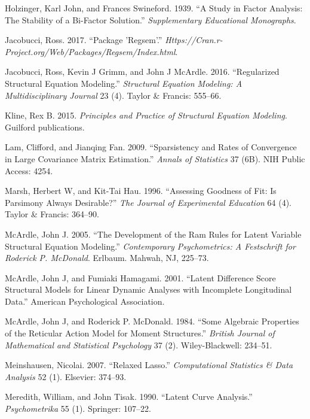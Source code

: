 \documentclass[article]{jss}
\begin{document}
\hypertarget{ref-holzinger1939study}{}
Holzinger, Karl John, and Frances Swineford. 1939. ``A Study in Factor
Analysis: The Stability of a Bi-Factor Solution.'' \emph{Supplementary
Educational Monographs}.

\hypertarget{ref-jacobucci2016package}{}
Jacobucci, Ross. 2017. ``Package 'Regsem'.''
\emph{Https://Cran.r-Project.org/Web/Packages/Regsem/Index.html}.

\hypertarget{ref-jacobucci2016regularized}{}
Jacobucci, Ross, Kevin J Grimm, and John J McArdle. 2016. ``Regularized
Structural Equation Modeling.'' \emph{Structural Equation Modeling: A
Multidisciplinary Journal} 23 (4). Taylor \& Francis: 555--66.

\hypertarget{ref-kline2015principles}{}
Kline, Rex B. 2015. \emph{Principles and Practice of Structural Equation
Modeling}. Guilford publications.

\hypertarget{ref-lam2009sparsistency}{}
Lam, Clifford, and Jianqing Fan. 2009. ``Sparsistency and Rates of
Convergence in Large Covariance Matrix Estimation.'' \emph{Annals of
Statistics} 37 (6B). NIH Public Access: 4254.

\hypertarget{ref-marsh1996assessing}{}
Marsh, Herbert W, and Kit-Tai Hau. 1996. ``Assessing Goodness of Fit: Is
Parsimony Always Desirable?'' \emph{The Journal of Experimental
Education} 64 (4). Taylor \& Francis: 364--90.

\hypertarget{ref-mcardle2005}{}
McArdle, John J. 2005. ``The Development of the Ram Rules for Latent
Variable Structural Equation Modeling.'' \emph{Contemporary
Psychometrics: A Festschrift for Roderick P. McDonald}. Erlbaum. Mahwah,
NJ, 225--73.

\hypertarget{ref-mcardle2001latent}{}
McArdle, John J, and Fumiaki Hamagami. 2001. ``Latent Difference Score
Structural Models for Linear Dynamic Analyses with Incomplete
Longitudinal Data.'' American Psychological Association.

\hypertarget{ref-McArdle_1984}{}
McArdle, John J, and Roderick P. McDonald. 1984. ``Some Algebraic
Properties of the Reticular Action Model for Moment Structures.''
\emph{British Journal of Mathematical and Statistical Psychology} 37
(2). Wiley-Blackwell: 234--51.

\hypertarget{ref-meinshausen2007relaxed}{}
Meinshausen, Nicolai. 2007. ``Relaxed Lasso.'' \emph{Computational
Statistics \& Data Analysis} 52 (1). Elsevier: 374--93.

\hypertarget{ref-meredith1990latent}{}
Meredith, William, and John Tisak. 1990. ``Latent Curve Analysis.''
\emph{Psychometrika} 55 (1). Springer: 107--22.
\end{document}
